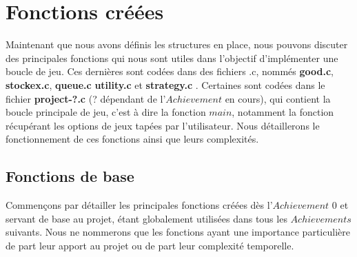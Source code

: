\documentclass{article}
\begin{document}
\section{Fonctions créées}
Maintenant que nous avons définis les structures en place, nous pouvons discuter des principales fonctions qui nous sont utiles dans l'objectif d'implémenter une boucle de jeu. Ces dernières sont codées dans des fichiers .c, nommés \textbf{good.c}, \textbf{stockex.c}, \textbf{queue.c} \textbf{utility.c} et \textbf{strategy.c} . Certaines sont codées dans le fichier \textbf{project-?.c} (? dépendant de l'$Achievement$ en cours), qui contient la boucle principale de jeu, c'est à dire la fonction $main$, notamment la fonction récupérant les options de jeux tapées par l'utilisateur. Nous détaillerons le fonctionnement de ces fonctions ainsi que leurs complexités.

\subsection{Fonctions de base}
Commençons par détailler les principales fonctions créées dès l'$Achievement$ 0 et servant de base au projet, étant globalement utilisées dans tous les $Achievements$ suivants. Nous ne nommerons que les fonctions ayant une importance particulière de part leur apport au projet ou de part leur complexité temporelle. 
\end{document}
